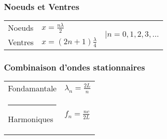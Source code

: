 \subsubsection{Noeuds et Ventres}
\begin{tabular}{l|ll}
    Noeuds & \(x=\frac{n\lambda}{2}\) & \multirow{2}{*}{\(\mid n = 0,1,2,3,\ldots\)}\\
    Ventres &  \(x=(2n+1)\frac{\lambda}{4}\) &
\end{tabular}
\subsubsection{Combinaison d'ondes stationnaires}
\begin{tabular}{ll}
    Fondamantale & \(\lambda_n = \frac{2L}{n}\) \\\rule{-2.5pt}{15pt}
    Harmoniques & \(f_n=\frac{nc}{2L}\)
\end{tabular}
